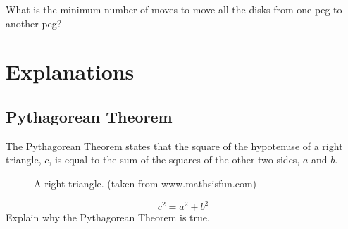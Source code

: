 \documentclass[letterpaper, 11pt]{report}
\numberwithin{equation}{section}
\begin{document}
			
			What is the minimum number of moves to move all the disks from one peg to another peg?
			
			
		
	
	\chapter{Explanations}
	
	
	
	
		\section{Pythagorean Theorem }
			
			The Pythagorean Theorem states that the square of the hypotenuse of a right triangle, $c$, is equal to the sum of the squares of the other two sides, $a$ and $b$.
			\begin{figure}[h!]
				\caption{A right triangle. (taken from www.mathsisfun.com)}
				\label{pythagorean}
			\end{figure}
			\begin{equation}
				c^2 = a^2 + b^2
			\end{equation}
			Explain why the Pythagorean Theorem is true.
			
	
\end{document}
